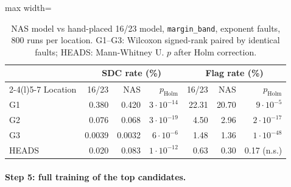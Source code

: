 \documentclass[10pt,a4paper]{article}
\newcommand{\meth}[1]{\texttt{#1}}
\newcommand{\ours}{\meth{margin\_band}}
\begin{document}
\begin{table}[H]
\centering\small
\caption{NAS model vs hand-placed 16/23 model, \ours, exponent faults, 800 runs per location. G1--G3: Wilcoxon
signed-rank paired by identical faults; HEADS: Mann-Whitney U. $p$ after Holm correction.}
\label{tab:paired}
\begin{adjustbox}{max width=\linewidth}
\begin{tabular}{@{}lrrrrrr@{}}
\toprule
 & \multicolumn{3}{c}{SDC rate (\%)} & \multicolumn{3}{c}{Flag rate (\%)} \\
\cmidrule(lr){2-4}\cmidrule(l){5-7}
Location & 16/23 & NAS & $p_{\mathrm{Holm}}$ & 16/23 & NAS & $p_{\mathrm{Holm}}$ \\
\midrule
G1    & 0.380  & 0.420  & $3\cdot10^{-14}$ & 22.31 & 20.70 & $9\cdot10^{-5}$ \\
G2    & 0.076  & 0.068  & $3\cdot10^{-19}$ & 4.50  & 2.96  & $2\cdot10^{-17}$ \\
G3    & 0.0039 & 0.0032 & $6\cdot10^{-6}$  & 1.48  & 1.36  & $1\cdot10^{-48}$ \\
HEADS & 0.020  & 0.083  & $1\cdot10^{-12}$ & 0.63  & 0.30  & 0.17 (n.s.) \\
\bottomrule
\end{tabular}
\end{adjustbox}
\end{table}

\paragraph{Step 5: full training of the top candidates.}
\end{document}
